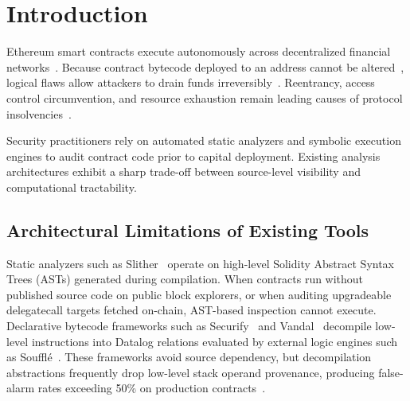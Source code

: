 \documentclass[pdflatex,sn-mathphys]{sn-jnl}
\theoremstyle{thmstyleone}
\theoremstyle{thmstyletwo}
\begin{document}

\maketitle

\section{Introduction}\label{sec:intro}

Ethereum smart contracts execute autonomously across decentralized financial networks~\cite{wood2014ethereum}. Because contract bytecode deployed to an address cannot be altered~\cite{wood2014ethereum,atzei2017survey}, logical flaws allow attackers to drain funds irreversibly~\cite{zhou2023sok,chen2020survey}. Reentrancy, access control circumvention, and resource exhaustion remain leading causes of protocol insolvencies~\cite{daian2020flash}. 

Security practitioners rely on automated static analyzers and symbolic execution engines to audit contract code prior to capital deployment. Existing analysis architectures exhibit a sharp trade-off between source-level visibility and computational tractability.

\subsection{Architectural Limitations of Existing Tools}\label{sec:intro:gaps}

Static analyzers such as Slither~\cite{feist2019slither} operate on high-level Solidity Abstract Syntax Trees (ASTs) generated during compilation. When contracts run without published source code on public block explorers, or when auditing upgradeable delegatecall targets fetched on-chain, AST-based inspection cannot execute. Declarative bytecode frameworks such as Securify~\cite{tsankov2018securify} and Vandal~\cite{brent2018vandal} decompile low-level instructions into Datalog relations evaluated by external logic engines such as Souffl{\'e}~\cite{scholz2016souffle}. These frameworks avoid source dependency, but decompilation abstractions frequently drop low-level stack operand provenance, producing false-alarm rates exceeding 50\% on production contracts~\cite{durieux2020empirical,ghaleb2020how}.
\end{document}
